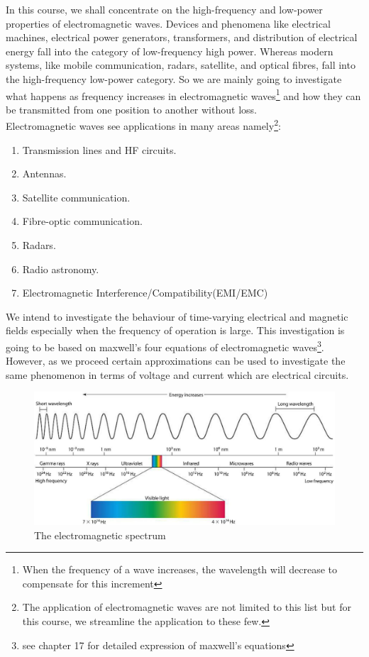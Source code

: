 In this course, we shall concentrate on the high-frequency and low-power properties of electromagnetic waves. Devices and phenomena like electrical machines, electrical power generators, transformers, and distribution of electrical energy fall into the category of low-frequency high power. Whereas modern systems, like mobile communication, radars, satellite, and optical fibres, fall into the high-frequency low-power category. So we are mainly going to investigate what happens as frequency increases in electromagnetic waves\footnote{When the frequency of a wave increases, the wavelength will decrease to compensate for this increment} and how they can be transmitted from one position to another without loss.\\

Electromagnetic waves see applications in many areas namely\footnote{The application of electromagnetic waves are not limited to this list but for this course, we streamline the application to these few.}:
\begin{enumerate}
\itemsep0em
\item Transmission lines and HF circuits.
\item Antennas.
\item Satellite communication.
\item Fibre-optic communication.
\item Radars.
\item Radio astronomy.
\item Electromagnetic Interference/Compatibility(EMI/EMC)
\end{enumerate}

We intend to investigate the behaviour of time-varying electrical and magnetic fields especially when the frequency of operation is large. This investigation is going to be based on maxwell's four equations of electromagnetic waves\footnote{see chapter 17 for detailed expression of maxwell's equations}. However, as we proceed certain approximations can be used to investigate the same phenomenon in terms of voltage and current which are electrical circuits.\\

\begin{figure}[h]
\centering
\includegraphics[width=1\linewidth]{./graphics/electromagneticspectrum}
\caption{The electromagnetic spectrum}
\label{fig:electromagneticspectrum}
\end{figure}


